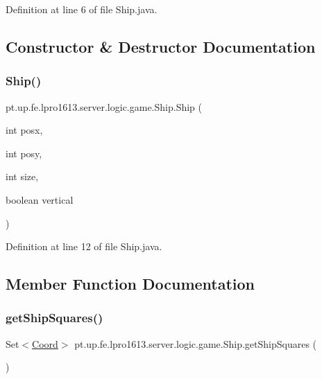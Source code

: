 Definition at line 6 of file Ship.\+java.



\subsection{Constructor \& Destructor Documentation}
\hypertarget{classpt_1_1up_1_1fe_1_1lpro1613_1_1server_1_1logic_1_1game_1_1_ship_a429cc1e75d290ba2af4e45e3d9325532}{}\label{classpt_1_1up_1_1fe_1_1lpro1613_1_1server_1_1logic_1_1game_1_1_ship_a429cc1e75d290ba2af4e45e3d9325532} 
\subsubsection{\texorpdfstring{Ship()}{Ship()}}
{\footnotesize\ttfamily pt.\+up.\+fe.\+lpro1613.\+server.\+logic.\+game.\+Ship.\+Ship (\begin{DoxyParamCaption}\item[{int}]{posx,  }\item[{int}]{posy,  }\item[{int}]{size,  }\item[{boolean}]{vertical }\end{DoxyParamCaption})}



Definition at line 12 of file Ship.\+java.



\subsection{Member Function Documentation}
\hypertarget{classpt_1_1up_1_1fe_1_1lpro1613_1_1server_1_1logic_1_1game_1_1_ship_ad33640a8641153ce7758d7c4613e02cb}{}\label{classpt_1_1up_1_1fe_1_1lpro1613_1_1server_1_1logic_1_1game_1_1_ship_ad33640a8641153ce7758d7c4613e02cb} 
\subsubsection{\texorpdfstring{get\+Ship\+Squares()}{getShipSquares()}}
{\footnotesize\ttfamily Set$<$\hyperlink{classpt_1_1up_1_1fe_1_1lpro1613_1_1sharedlib_1_1utils_1_1_coord}{Coord}$>$ pt.\+up.\+fe.\+lpro1613.\+server.\+logic.\+game.\+Ship.\+get\+Ship\+Squares (\begin{DoxyParamCaption}{ }\end{DoxyParamCaption})}



